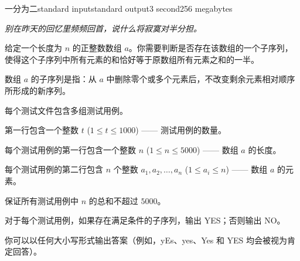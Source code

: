 \begin{problem}{一分为二}{standard input}{standard output}{3 second}{256 megabytes}

\textit{别在昨天的回忆里频频回首，说什么将寂寞对半分担。}

给定一个长度为 $n$ 的正整数数组 $a$。你需要判断是否存在该数组的一个子序列，使得这个子序列中所有元素的和恰好等于原数组所有元素之和的一半。

数组 $a$ 的子序列是指：从 $a$ 中删除零个或多个元素后，不改变剩余元素相对顺序所形成的新序列。


\InputFile
每个测试文件包含多组测试用例。

第一行包含一个整数 $t$ ($1 \le t \le 1000$) ------ 测试用例的数量。

每个测试用例的第一行包含一个整数 $n$ ($1 \le n \le 5000$) ------ 数组 $a$ 的长度。

每个测试用例的第二行包含 $n$ 个整数 $a_1, a_2, \dots, a_n$ ($1 \le a_i \le n$) ------ 数组 $a$ 的元素。

保证所有测试用例中 $n$ 的总和不超过 $5000$。

\OutputFile
对于每个测试用例，如果存在满足条件的子序列，输出 YES；否则输出 NO。

你可以以任何大小写形式输出答案（例如，yEs、yes、Yes 和 YES 均会被视为肯定回答）。


\end{problem}